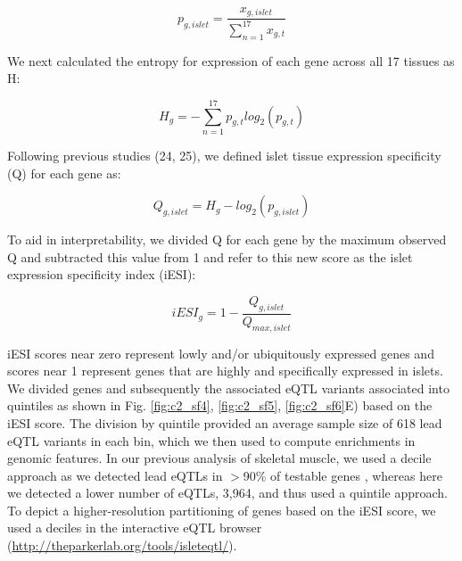 \[ p_{g,islet} = \frac{x_{g,islet}}{\sum_{n=1}^{17}x_{g,t}}  \]

We next calculated the entropy for expression of each gene across all 17 tissues as H:

\[ H_g = -\sum_{n=1}^{17}p_{g,t} log_2(p_{g,t}) \]

Following previous studies (24, 25), we defined islet tissue expression specificity (Q) for each gene as:

\[ Q_{g,islet} = H_g - log_2(p_{g,islet}) \]

To aid in interpretability, we divided Q for each gene by the maximum observed Q and subtracted this value from 1 and refer to this new score as the islet expression specificity index (iESI):

\[ iESI_g = 1 - \frac{Q_{g,islet}}{Q_{max,islet}} \]

iESI scores near zero represent lowly and/or ubiquitously expressed genes and scores near 1 represent genes that are highly and specifically expressed in islets. We divided genes and subsequently the associated eQTL variants associated into quintiles as shown in Fig. \ref{fig:c2_sf4}, \ref{fig:c2_sf5}, \ref{fig:c2_sf6}E) based on the iESI score. The division by quintile provided an average sample size of 618 lead eQTL variants in each bin, which we then used to compute enrichments in genomic features. In our previous analysis of skeletal muscle, we used a decile approach as we detected lead eQTLs in $>$90\% of testable genes \cite{scottGeneticRegulatorySignature2016}, whereas here we detected a lower number of eQTLs, 3,964, and thus used a quintile approach. To depict a higher-resolution partitioning of genes based on the iESI score, we used a deciles in the interactive eQTL browser (\url{http://theparkerlab.org/tools/isleteqtl/}).

